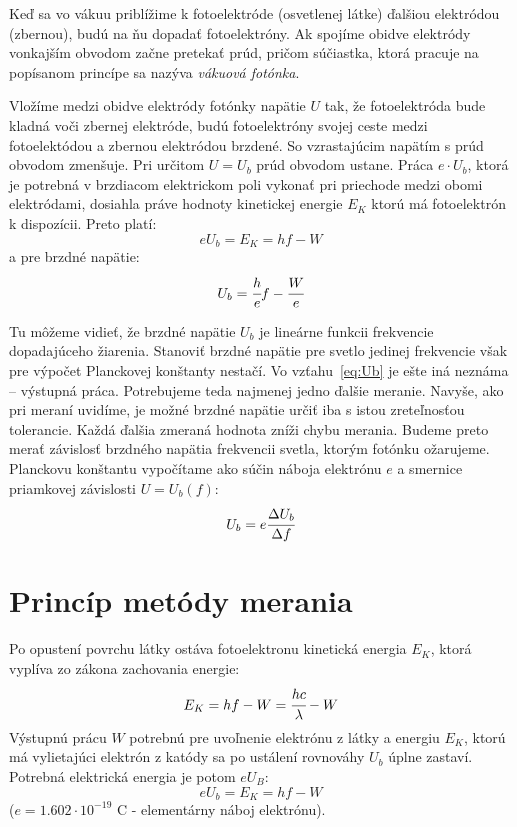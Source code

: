 \documentclass[12pt,a4paper,final]{report}
\begin{document}
Keď sa vo vákuu priblížime k fotoelektróde (osvetlenej látke) ďalšiou elektródou (zbernou), budú na ňu dopadať fotoelektróny. Ak spojíme obidve elektródy vonkajším obvodom začne pretekať prúd, pričom súčiastka, ktorá pracuje na popísanom princípe sa nazýva \textit{vákuová fotónka}.

Vložíme medzi obidve elektródy fotónky napätie $U$ tak, že fotoelektróda bude kladná voči zbernej elektróde, budú fotoelektróny svojej ceste medzi fotoelektódou a zbernou elektródou brzdené. So vzrastajúcim napätím s prúd obvodom zmenšuje. Pri určitom $U=U_b$ prúd obvodom ustane. Práca $e\cdot U_b$, ktorá je potrebná v brzdiacom elektrickom poli vykonať pri priechode medzi obomi elektródami, dosiahla práve hodnoty kinetickej energie $E_K$ ktorú má fotoelektrón k dispozícii. Preto platí:
\begin{equation} \label{eq:eUb}
	eU_b=E_K=hf-W
\end{equation}
a pre brzdné napätie:
\begin{equation} \label{eq:Ub}
	U_b=\cfrac{h}{e}f-\cfrac{W}{e}
\end{equation}

Tu môžeme vidieť, že brzdné napätie $U_b$ je lineárne funkcii frekvencie dopadajúceho žiarenia. Stanoviť brzdné napätie pre svetlo jedinej frekvencie však pre výpočet Planckovej konštanty nestačí. Vo vzťahu~\eqref{eq:Ub} je ešte iná neznáma – výstupná práca. Potrebujeme teda najmenej jedno ďalšie meranie. Navyše, ako pri meraní uvidíme, je možné brzdné napätie určiť iba s istou zreteľnosťou tolerancie. Každá ďalšia zmeraná hodnota zníži chybu merania. Budeme preto merať závislosť brzdného napätia frekvencii svetla, ktorým fotónku ožarujeme. Planckovu konštantu vypočítame ako súčin náboja elektrónu $e$ a smernice priamkovej závislosti $U=U_b(f)$:
\begin{equation}
	U_b=e\cfrac{\Delta U_b}{\Delta f}
\end{equation}

\section*{Princíp metódy merania}
Po opustení povrchu látky ostáva fotoelektronu kinetická energia $E_K$, ktorá vyplíva zo zákona zachovania energie:
\begin{equation}
	E_K=hf-W=\cfrac{hc}{\lambda}-W
\end{equation}
Výstupnú prácu $W$ potrebnú pre uvoľnenie elektrónu z látky a energiu $E_K$, ktorú má vylietajúci elektrón z katódy sa po ustálení rovnováhy $U_b$ úplne zastaví. Potrebná elektrická energia je potom $eU_B$:
\begin{equation}
	eU_b=E_K=hf-W
\end{equation} ($e = 1.602\cdot 10^{-19}$ C - elementárny náboj elektrónu).
\end{document}
